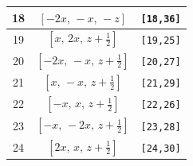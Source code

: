 \documentclass[fleqn,8pt]{jsarticle}
\begin{document}
\begin{longtable}{ccc}
18 & $\left[ - 2 x,\, - x,\, - z \right]$ & {\tt [18,36]} \\ \hline
19 & $\left[ x,\, 2 x,\, z + \frac{1}{2} \right]$ & {\tt [19,25]} \\ \hline
20 & $\left[ - 2 x,\, - x,\, z + \frac{1}{2} \right]$ & {\tt [20,27]} \\ \hline
21 & $\left[ x,\, - x,\, z + \frac{1}{2} \right]$ & {\tt [21,29]} \\ \hline
22 & $\left[ - x,\, x,\, z + \frac{1}{2} \right]$ & {\tt [22,26]} \\ \hline
23 & $\left[ - x,\, - 2 x,\, z + \frac{1}{2} \right]$ & {\tt [23,28]} \\ \hline
24 & $\left[ 2 x,\, x,\, z + \frac{1}{2} \right]$ & {\tt [24,30]} \\
\end{longtable}
\renewcommand{\arraystretch}{1.2}
\end{document}
